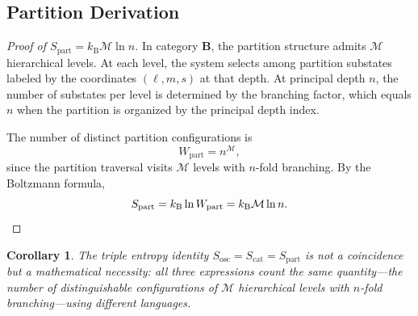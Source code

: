 \documentclass[twocolumn,10pt]{article}
\newtheorem{corollary}[theorem]{Corollary}
\theoremstyle{remark}
\newcommand{\kB}{k_{\mathrm{B}}}
\newcommand{\Depth}{\mathcal{M}}
\newcommand{\CatB}{\mathbf{B}}
\begin{document}
\subsection{Partition Derivation}

\begin{proof}[Proof of $S_{\mathrm{part}} = \kB \Depth \ln n$]
In category $\CatB$, the partition structure admits $\Depth$ hierarchical levels.
At each level, the system selects among partition substates labeled by the coordinates $(\ell, m, s)$ at that depth.
At principal depth $n$, the number of substates per level is determined by the branching factor, which equals $n$ when the partition is organized by the principal depth index.

The number of distinct partition configurations is
\begin{equation}
W_{\mathrm{part}} = n^{\Depth},
\end{equation}
since the partition traversal visits $\Depth$ levels with $n$-fold branching.
By the Boltzmann formula,
\begin{equation}
S_{\mathrm{part}} = \kB \ln W_{\mathrm{part}} = \kB \Depth \ln n. \qedhere
\end{equation}
\end{proof}

\begin{corollary}
\label{cor:entropy_identity}
The triple entropy identity $S_{\mathrm{osc}} = S_{\mathrm{cat}} = S_{\mathrm{part}}$ is not a coincidence but a mathematical necessity: all three expressions count the same quantity---the number of distinguishable configurations of $\Depth$ hierarchical levels with $n$-fold branching---using different languages.
\end{corollary}
\end{document}
